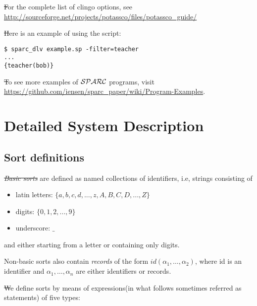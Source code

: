 \documentclass[12pt, letterpaper]{article}
\begin{document}
\st
For the complete list of clingo options, see 
\url{http://sourceforge.net/projects/potassco/files/potassco_guide/}


\st
Here is an example of using the script:
\begin{verbatim}
$ sparc_dlv example.sp -filter=teacher
...
{teacher(bob)}
\end{verbatim}
\st To see more examples of ${\cal SPARC}$ programs, visit \url{https://github.com/iensen/sparc_paper/wiki/Program-Examples}.
\section{Detailed System Description}

\subsection{Sort definitions}\label{ss}



\st \textit{Basic sorts} are defined as named collections of identifiers, i.e, strings consisting of
\begin{itemize}
 \item latin letters: $\{a,b,c,d,...,z,A,B,C,D,...,Z\}$
 \item digits: $\{0,1,2,...,9\}$
 \item underscore: $\_$
\end{itemize}
and either starting from a letter or containing only digits.

Non-basic sorts also contain \textit{records} of the form $id(\alpha_1,\dots, \alpha_2)$, where id is an identifier and 
$\alpha_1, \dots, \alpha_n$ are either identifiers or records. 


\st We define sorts by means of expressions(in what follows sometimes referred as statements) of five types:
\end{document}
